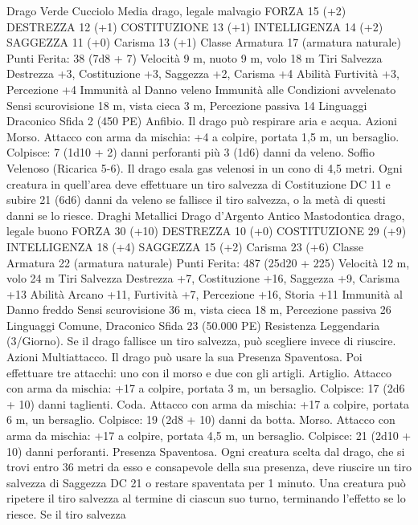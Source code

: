 \begin{multicols}{2}
Drago Verde Cucciolo
Media drago, legale malvagio
FORZA 15 (+2)
DESTREZZA 12 (+1)
COSTITUZIONE 13 (+1)
INTELLIGENZA 14 (+2)
SAGGEZZA 11 (+0)
Carisma 13 (+1)
Classe Armatura 17 (armatura naturale)
\hspace*{0pt}\hfill{Punti Ferita}: 38 (7d8 + 7)
Velocità 9 m, nuoto 9 m, volo 18 m
Tiri Salvezza Destrezza +3, Costituzione +3, Saggezza +2,
Carisma +4
Abilità Furtività +3, Percezione +4
Immunità al Danno veleno
Immunità alle Condizioni avvelenato
Sensi scurovisione 18 m, vista cieca 3 m, Percezione passiva 14
Linguaggi Draconico
Sfida 2 (450 PE)
Anfibio. Il drago può respirare aria e acqua.
Azioni
Morso. Attacco con arma da mischia: +4 a colpire, portata 1,5
m, un bersaglio.
Colpisce: 7 (1d10 + 2) danni perforanti più 3 (1d6) danni da veleno.
Soffio Velenoso (Ricarica 5-6). Il drago esala gas velenosi in un
cono di 4,5 metri. Ogni creatura in quell’area deve effettuare un tiro
salvezza di Costituzione DC 11 e subire 21 (6d6) danni da veleno se
fallisce il tiro salvezza, o la metà di questi danni se lo riesce.
Draghi Metallici
Drago d’Argento Antico
Mastodontica drago, legale buono
FORZA 30 (+10)
DESTREZZA 10 (+0)
COSTITUZIONE 29 (+9)
INTELLIGENZA 18 (+4)
SAGGEZZA 15 (+2)
Carisma 23 (+6)
Classe Armatura 22 (armatura naturale)
\hspace*{0pt}\hfill{Punti Ferita}: 487 (25d20 + 225)
Velocità 12 m, volo 24 m
Tiri Salvezza Destrezza +7, Costituzione +16, Saggezza +9,
Carisma +13
Abilità Arcano +11, Furtività +7, Percezione +16, Storia +11
Immunità al Danno freddo
Sensi scurovisione 36 m, vista cieca 18 m, Percezione passiva 26
Linguaggi Comune, Draconico
Sfida 23 (50.000 PE)
Resistenza Leggendaria (3/Giorno). Se il drago fallisce un tiro
salvezza, può scegliere invece di riuscire.
Azioni
Multiattacco. Il drago può usare la sua Presenza Spaventosa. Poi
effettuare tre attacchi: uno con il morso e due con gli artigli.
Artiglio. Attacco con arma da mischia: +17 a colpire, portata 3
m, un bersaglio.
Colpisce: 17 (2d6 + 10) danni taglienti.
Coda. Attacco con arma da mischia: +17 a colpire, portata 6 m,
un bersaglio.
Colpisce: 19 (2d8 + 10) danni da botta.
Morso. Attacco con arma da mischia: +17 a colpire, portata 4,5
m, un bersaglio.
Colpisce: 21 (2d10 + 10) danni perforanti.
Presenza Spaventosa. Ogni creatura scelta dal drago, che si trovi
entro 36 metri da esso e consapevole della sua presenza, deve
riuscire un tiro salvezza di Saggezza DC 21 o restare spaventata per
1 minuto. Una creatura può ripetere il tiro salvezza al termine di
ciascun suo turno, terminando l’effetto se lo riesce. Se il tiro salvezza

\end{multicols}
